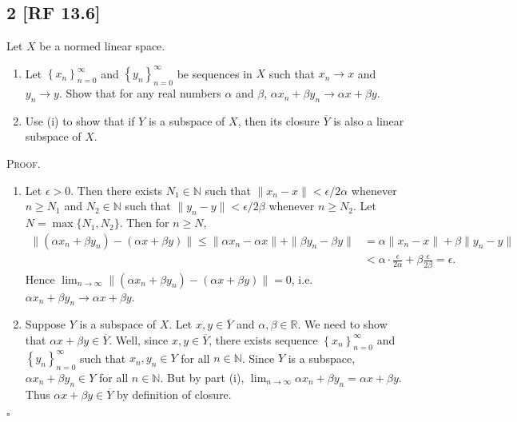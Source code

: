 \documentclass[12pt]{article}
\newcounter{ProofCounter}
\newenvironment{Proof}{\stepcounter{ProofCounter}\textsc{Proof.}}{\hfill$\square$}
\begin{document}
\subsection*{2 [RF 13.6]}
\begin{tcolorbox}
  Let $X$ be a normed linear space.
  \begin{enumerate}[label = (\roman*)]
    \item Let $\left\{ x_n \right\}_{n=0}^{\infty}$ and $\left\{ y_{n} \right\}_{n=0}^{\infty}$ be sequences in $X$ such that $x_n \rightarrow x$ and
      $y_n \rightarrow y$. Show that for any real numbers $\alpha$ and $\beta$, $\alpha x_n + \beta y_n \rightarrow \alpha x + \beta y$.
    \item Use (i) to show that if $Y$ is a subspace of $X$, then its closure $\overline{Y}$ is also a linear subspace of $X$.
  \end{enumerate}
\end{tcolorbox}
\begin{Proof}
  \begin{enumerate}[label = (\roman*)]
    \item Let $\epsilon > 0$. Then there exists $N_{1} \in \mathbb{N}$ such that $\| x_n - x\| < \epsilon / 2\alpha$ whenever $n \geq N_1$ and $N_2 \in \mathbb{N}$ 
      such that $\|y_n - y\| < \epsilon / 2\beta$ whenever $n \geq N_2$. Let $N = \max\{N_1, N_2\}$. Then for $n \geq N$,
      \begin{align*}
        \|(\alpha x_n + \beta y_n) - (\alpha x + \beta y)\| \leq \|\alpha x_n - \alpha x\| + \|\beta y_n - \beta y\| & = \alpha \|x_n - x\| + \beta
        \|y_n - y\| \\
        & < \alpha \cdot \frac{\epsilon}{2\alpha} + \beta \frac{\epsilon}{2\beta} = \epsilon.
      \end{align*}
      Hence $\lim_{n\rightarrow\infty}\|(\alpha x_n + \beta y_n) - (\alpha x + \beta y)\| = 0$, i.e. $\alpha x_n + \beta y_n \rightarrow \alpha x +
      \beta y$.
    \item Suppose $Y$ is a subspace of $X$. Let $x,y \in \overline{Y}$ and $\alpha, \beta \in \mathbb{R}$. We need to show that $\alpha x + \beta y
      \in \overline{Y}$. Well, since $x,y \in \overline{Y}$, there exists sequence $\left\{ x_n \right\}_{n=0}^{\infty}$ and $\left\{ y_n
      \right\}_{n=0}^{\infty}$ such that $x_n,y_n \in Y$ for all $n \in \mathbb{N}$. Since $Y$ is a subspace, $\alpha x_n + \beta y_n \in Y$ for all $n
      \in \mathbb{N}$. But by part (i), $\lim_{n\rightarrow \infty}\alpha x_n + \beta y_n = \alpha x + \beta y$. Thus $\alpha x + \beta y \in
      \overline{Y}$ by definition of closure.
  \end{enumerate}
\end{Proof}
\end{document}
